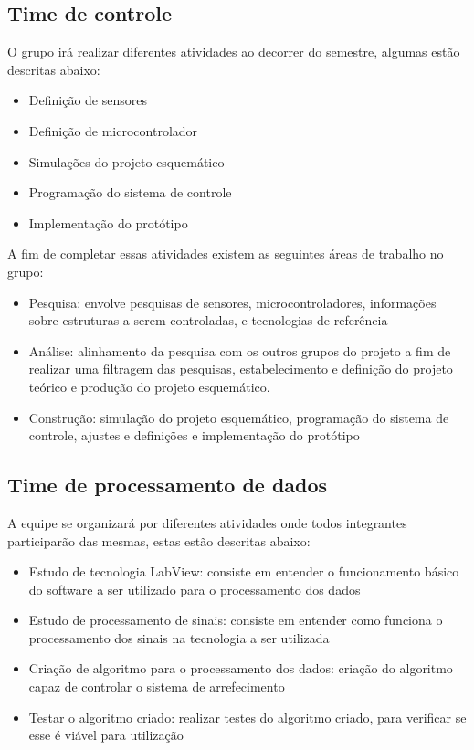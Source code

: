 \subsection{Time de controle}

O grupo irá realizar diferentes atividades ao decorrer do semestre, algumas estão descritas abaixo:
\begin{itemize}
\item Definição de sensores
\item Definição de microcontrolador
\item Simulações do projeto esquemático
\item Programação do sistema de controle
\item Implementação do protótipo
\end{itemize}

A fim de completar essas atividades existem as seguintes áreas de trabalho no grupo:

\begin{itemize}
\item Pesquisa: envolve pesquisas de sensores, microcontroladores, informações sobre estruturas a serem controladas, e tecnologias de referência
\item Análise: alinhamento da pesquisa com os outros grupos do projeto a fim de realizar uma filtragem das pesquisas, estabelecimento e definição do projeto teórico e produção do projeto esquemático.
\item Construção: simulação do projeto esquemático, programação do sistema de controle, ajustes e definições e implementação do protótipo

\end{itemize}

\subsection{Time de processamento de dados}

A equipe se organizará por diferentes atividades onde todos integrantes participarão das mesmas, estas estão descritas abaixo:

\begin{itemize}
\item Estudo de tecnologia LabView: consiste em entender o funcionamento básico do software a ser utilizado para o processamento dos dados
\item Estudo de processamento de sinais: consiste em entender como funciona o processamento dos sinais na tecnologia a ser utilizada
\item Criação de algoritmo para o processamento dos dados: criação do algoritmo capaz de controlar o sistema de arrefecimento
\item Testar o algoritmo criado: realizar testes do algoritmo criado, para verificar se esse é viável para utilização
\end{itemize}

